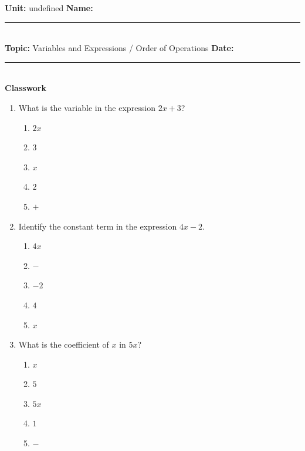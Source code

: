 \documentclass[10pt]{article}
\begin{document}
\enlargethispage{2.5cm}

\begin{tcolorbox}[colback=mainblue!5, colframe=mainblue, sharp corners, boxrule=0.5pt]
    \small \textbf{Unit:} undefined \hfill \textbf{Name:} \rule{3cm}{0.4pt} \\
    \small \textbf{Topic:} Variables and Expressions / Order of Operations \hfill \textbf{Date:} \rule{2cm}{0.4pt} \\
    \centering \textbf{\large Classwork}
\end{tcolorbox}

\vspace{0.2cm}

\begin{multicols}{2}
\begin{enumerate}[label=\textbf{Q\arabic*.}, leftmargin=*, itemsep=6pt, parsep=0pt]

  \item \small What is the variable in the expression $2x + 3$?
  \begin{enumerate}[label=(\Alph*), leftmargin=0.6cm, nosep, itemsep=2pt]
    \item $2x$
    \item $3$
    \item $x$
    \item $2$
    \item $+$
  \end{enumerate}

  \item \small Identify the constant term in the expression $4x - 2$.
  \begin{enumerate}[label=(\Alph*), leftmargin=0.6cm, nosep, itemsep=2pt]
    \item $4x$
    \item $-$
    \item $-2$
    \item $4$
    \item $x$
  \end{enumerate}

  \item \small What is the coefficient of $x$ in $5x$?
  \begin{enumerate}[label=(\Alph*), leftmargin=0.6cm, nosep, itemsep=2pt]
    \item $x$
    \item $5$
    \item $5x$
    \item $1$
    \item $-$
  \end{enumerate}


\end{enumerate}
\end{multicols}
\end{document}
